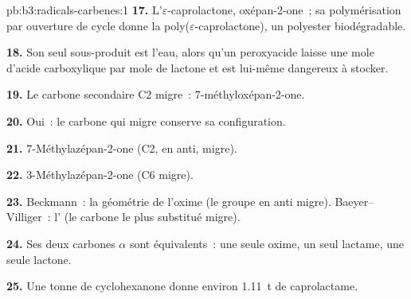 \begin{solution}{pb:b3:radicals-carbenes:1}
\textbf{17.} L'$\varepsilon$-caprolactone, oxépan-2-one~; sa polymérisation par ouverture de cycle donne la
poly($\varepsilon$-caprolactone), un polyester biodégradable.

\textbf{18.} Son seul sous-produit est l'eau, alors qu'un peroxyacide laisse
une mole d'acide carboxylique par mole de lactone et est lui-même dangereux
à stocker.

\textbf{19.} Le carbone secondaire C2 migre~: 7-méthyloxépan-2-one.

\textbf{20.} Oui~: le carbone qui migre conserve sa configuration.

\textbf{21.} 7-Méthylazépan-2-one (C2, en anti, migre).

\textbf{22.} 3-Méthylazépan-2-one (C6 migre).

\textbf{23.} Beckmann~: la géométrie de l'oxime (le groupe en anti migre).
Baeyer--Villiger~: l' (le carbone le plus substitué
migre).

\textbf{24.} Ses deux carbones $\alpha$ sont équivalents~: une seule oxime, un seul lactame, une seule lactone.

\textbf{25.} Une tonne de cyclohexanone donne environ \qty{1.11}{t} de caprolactame.
\end{solution}
